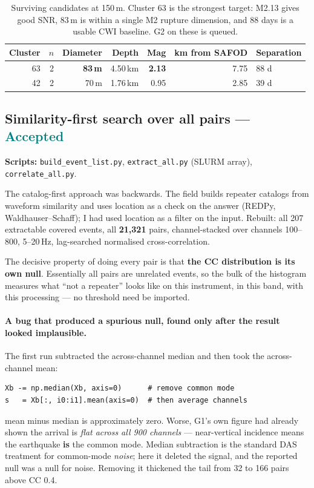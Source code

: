 \documentclass[11pt]{article}
\newcommand{\accepted}{\textcolor{teal}{\textbf{Accepted}}}
\begin{document}
\begin{table}[H]
\centering
\begin{tabular}{rrrrrrl}
\toprule
Cluster & $n$ & Diameter & Depth & Mag & km from SAFOD & Separation \\
\midrule
63 & 2 & \textbf{83\,m} & 4.50\,km & \textbf{2.13} & 7.75 & 88 d \\
42 & 2 & 70\,m & 1.76\,km & 0.95 & 2.85 & 39 d \\
\bottomrule
\end{tabular}
\caption{Surviving candidates at 150\,m. Cluster 63 is the strongest target:
M2.13 gives good SNR, 83\,m is within a single M2 rupture dimension, and 88 days
is a usable CWI baseline. G2 on these is queued.}
\end{table}

\subsection{Similarity-first search over all pairs --- \accepted}

\textbf{Scripts:} \texttt{build\_event\_list.py}, \texttt{extract\_all.py} (SLURM
array), \texttt{correlate\_all.py}.

The catalog-first approach was backwards. The field builds repeater catalogs from
waveform similarity and uses location as a check on the answer (REDPy,
Waldhauser--Schaff); I had used location as a filter on the input. Rebuilt: all
207 extractable covered events, all \textbf{21{,}321} pairs, channel-stacked over
channels 100--800, 5--20\,Hz, lag-searched normalised cross-correlation.

The decisive property of doing every pair is that \textbf{the CC distribution is
its own null}. Essentially all pairs are unrelated events, so the bulk of the
histogram measures what ``not a repeater'' looks like on this instrument, in this
band, with this processing --- no threshold need be imported.

\paragraph{A bug that produced a spurious null, found only after the result
looked implausible.} The first run subtracted the across-channel median and then
took the across-channel mean:
\begin{verbatim}
Xb -= np.median(Xb, axis=0)      # remove common mode
s   = Xb[:, i0:i1].mean(axis=0)  # then average channels
\end{verbatim}
mean minus median is approximately zero. Worse, G1's own figure had already shown
the arrival is \emph{flat across all 900 channels} --- near-vertical incidence
means the earthquake \textbf{is} the common mode. Median subtraction is the
standard DAS treatment for common-mode \emph{noise}; here it deleted the signal,
and the reported null was a null for noise. Removing it thickened the tail from 32
to 166 pairs above CC 0.4.
\end{document}
